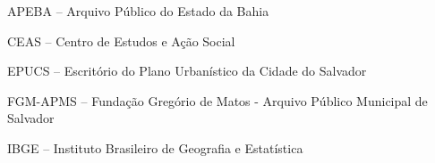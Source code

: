 \begin{siglas}
\item APEBA -- Arquivo Público do Estado da Bahia
\item CEAS -- Centro de Estudos e Ação Social
\item EPUCS -- Escritório do Plano Urbanístico da Cidade do Salvador
\item FGM-APMS -- Fundação Gregório de Matos - Arquivo Público Municipal de Salvador
\item IBGE -- Instituto Brasileiro de Geografia e Estatística
\end{siglas}